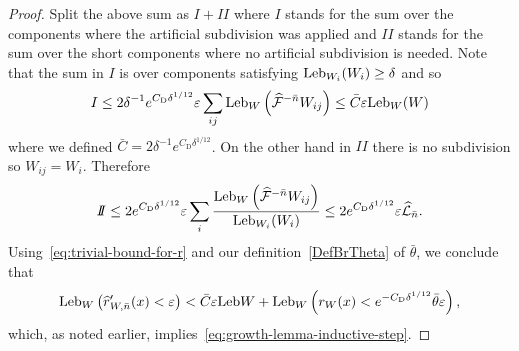 \documentclass[AHL, Unicode, longabstracts,published]{cedram}
\newcommand{\eps}{\varepsilon}
\newcommand{\inv}{^{-1}}
\newcommand{\cm}{\mathcal{F}}
\newcommand{\cmp}{\hat\cm}
\newcommand{\cL}{\mathcal{L}}
\newcommand{\Leb}{\textup{Leb}}
\newcommand{\Cdist}{C_\mathrm{D}}
\newcommand*\RmII{{{I\!\!I}}}
\let\oldhat\hat
\renewcommand*{\hat}[1]{\mathchoice{\widehat{#1}}{\widehat{#1}}{\oldhat{#1}}{\oldhat{#1}}}
\begin{document}
\begin{proof}
Split the above sum as $I+\RmII$ where $I$ stands for the sum over the components where the artificial subdivision was applied and $\RmII$ stands for the sum over the short components where no artificial subdivision is needed. Note that the sum in $I$ is over components satisfying $\Leb_{W_i}(W_i)\geq \delta$ and so
\begin{align*}
I\leq 2\delta\inv e^{\Cdist\delta^{1/12}}\eps
\sum_{ij}\Leb_{W}\left(\cmp^{-\bar n}W_{ij}\right) \le \bar C\eps\Leb_{W}(W)
\end{align*}
where we defined $\bar C = 2\delta\inv e^{\Cdist\delta^{1/12}}$. On the other hand in $\RmII$ there is no subdivision so $W_{ij}=W_i$. Therefore
\begin{align*}
\RmII\le 2e^{\Cdist\delta^{1/12}}\eps\sum_{i}\frac{\Leb_{W}\left(\cmp^{-\bar n}W_{ij}\right)}{\Leb_{W_{i}}(W_{i})} \le 2e^{\Cdist\delta^{1/12}}\eps\hat\cL_{\bar n}.
\end{align*}
Using~\eqref{eq:trivial-bound-for-r} and our definition~\eqref{DefBrTheta} of $\bar\theta$, we conclude that
\begin{align}\label{eq:growth-lemma-inductive-step-r'}
\Leb_{W}\left(\hat r'_{W,\bar n}(x) < \eps\right) < \bar C\eps\Leb W + \Leb_{W}\left(r_{W}(x) < e^{-\Cdist\delta^{1/12}}\bar\theta\eps\right),
\end{align}
which, as noted earlier, implies~\eqref{eq:growth-lemma-inductive-step}.


\end{proof}
\end{document}
